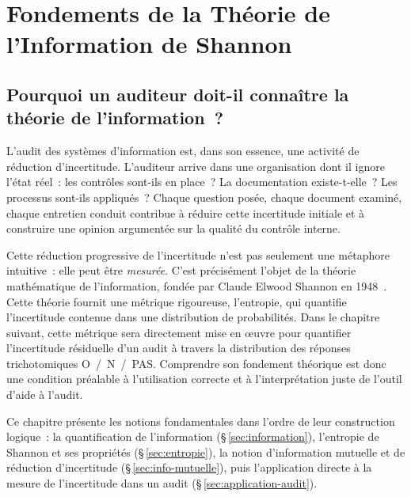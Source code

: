 
\chapter{Fondements de la Théorie de l'Information de Shannon}
\label{chap:shannon}

\section{Pourquoi un auditeur doit-il connaître la théorie de l'information~?}
\label{sec:motivation}

L'audit des systèmes d'information est, dans son essence, une activité de
réduction d'incertitude. L'auditeur arrive dans une organisation dont il ignore
l'état réel~: les contrôles sont-ils en place~? La documentation existe-t-elle~?
Les processus sont-ils appliqués~? Chaque question posée, chaque document
examiné, chaque entretien conduit contribue à réduire cette incertitude initiale
et à construire une opinion argumentée sur la qualité du contrôle interne.

Cette réduction progressive de l'incertitude n'est pas seulement une métaphore
intuitive~: elle peut être \emph{mesurée}. C'est précisément l'objet de la
théorie mathématique de l'information, fondée par Claude Elwood Shannon en
1948~\cite{Shannon1948}. Cette théorie fournit une métrique rigoureuse, l'entropie,
qui quantifie l'incertitude contenue dans une distribution de probabilités. Dans
le chapitre suivant, cette métrique sera directement mise en œuvre pour
quantifier l'incertitude résiduelle d'un audit à travers la distribution des
réponses trichotomiques O~/~N~/~PAS. Comprendre son fondement théorique est donc
une condition préalable à l'utilisation correcte et à l'interprétation juste de
l'outil d'aide à l'audit.

Ce chapitre présente les notions fondamentales dans l'ordre de leur construction
logique~: la quantification de l'information (§\,\ref{sec:information}), l'entropie
de Shannon et ses propriétés (§\,\ref{sec:entropie}), la notion d'information
mutuelle et de réduction d'incertitude (§\,\ref{sec:info-mutuelle}), puis
l'application directe à la mesure de l'incertitude dans un audit
(§\,\ref{sec:application-audit}).

